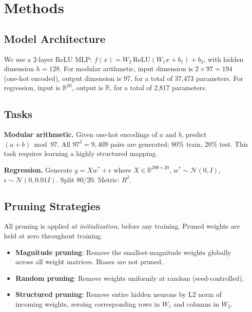 \documentclass[11pt,a4paper]{article}
\begin{document}
\section{Methods}

\subsection{Model Architecture}

We use a 2-layer ReLU MLP: $f(x) = W_2 \, \text{ReLU}(W_1 x + b_1) + b_2$, with hidden dimension $h = 128$. For modular arithmetic, input dimension is $2 \times 97 = 194$ (one-hot encoded), output dimension is 97, for a total of 37,473 parameters. For regression, input is $\mathbb{R}^{20}$, output is $\mathbb{R}$, for a total of 2,817 parameters.

\subsection{Tasks}

\textbf{Modular arithmetic.} Given one-hot encodings of $a$ and $b$, predict $(a + b) \bmod 97$. All $97^2 = 9{,}409$ pairs are generated; 80\% train, 20\% test. This task requires learning a highly structured mapping.

\textbf{Regression.} Generate $y = Xw^* + \epsilon$ where $X \in \mathbb{R}^{200 \times 20}$, $w^* \sim \mathcal{N}(0, I)$, $\epsilon \sim \mathcal{N}(0, 0.01 I)$. Split 80/20. Metric: $R^2$.

\subsection{Pruning Strategies}

All pruning is applied \emph{at initialization}, before any training. Pruned weights are held at zero throughout training.

\begin{itemize}
    \item \textbf{Magnitude pruning}: Remove the smallest-magnitude weights globally across all weight matrices. Biases are not pruned.
    \item \textbf{Random pruning}: Remove weights uniformly at random (seed-controlled).
    \item \textbf{Structured pruning}: Remove entire hidden neurons by L2 norm of incoming weights, zeroing corresponding rows in $W_1$ and columns in $W_2$.
\end{itemize}
\end{document}
